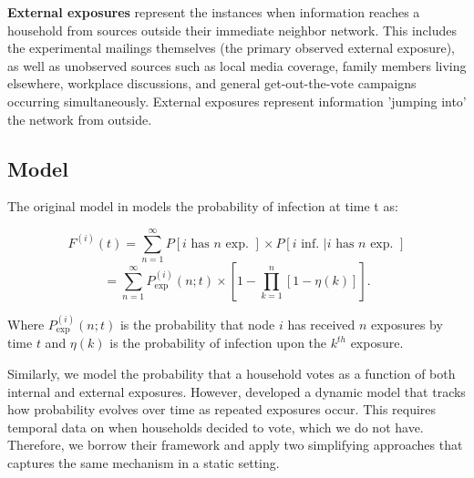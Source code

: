 \documentclass[11pt, draft]{article}
\begin{document}
\textbf{External exposures} represent the instances when information reaches a household from sources outside their immediate neighbor network. This includes the experimental mailings themselves (the primary observed external exposure), as well as unobserved sources such as local media coverage, family members living elsewhere, workplace discussions, and general get-out-the-vote campaigns occurring simultaneously. External exposures represent information 'jumping into' the network from outside.

\subsection{Model}
The original model in \cite{myers_information_2012} models the probability of infection at time t as:

\begin{equation*}
    F^{(i)}(t) = \sum_{n=1}^{\infty} P[i \text{ has } n \text{ exp. }] \times P[i \text{ inf. } | i \text{ has } n \text{ exp. }]
\end{equation*}
\begin{equation*}
    = \sum_{n=1}^{\infty} P_{\exp}^{(i)}(n; t) \times \left[ 1 - \prod_{k=1}^{n} [1 - \eta(k)] \right].
\end{equation*}

Where $P_{\exp}^{(i)}(n; t)$ is the probability that node $i$ has received $n$ exposures by time $t$ and $\eta(k)$ is the probability of infection upon the $k^{th}$ exposure.

Similarly, we model the probability that a household votes as a function of both internal and external exposures. However, \cite{myers_information_2012} developed a dynamic model that tracks how probability evolves over time as repeated exposures occur. This requires temporal data on when households decided to vote, which we do not have. Therefore, we borrow their framework and apply two simplifying approaches that captures the same mechanism in a static setting.
\end{document}
